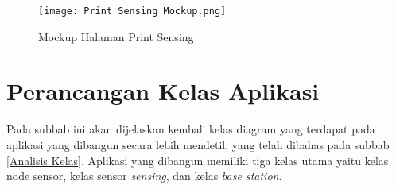     \begin{figure}[H]
    	\centering  
    	\texttt{[image: Print Sensing Mockup.png]}  
    	\caption[Mockup Halaman Print Sensing]{Mockup Halaman Print Sensing} 
    	\label{fig:Mockup Halaman Print Sensing} 
    \end{figure}
   
   

\section{Perancangan Kelas Aplikasi}
    
    Pada subbab ini akan dijelaskan kembali kelas diagram yang terdapat pada aplikasi yang dibangun secara lebih mendetil, yang telah dibahas pada subbab \ref{Analisis Kelas}. Aplikasi yang dibangun memiliki tiga kelas utama yaitu kelas node sensor, kelas sensor \textit{sensing}, dan kelas \textit{base station}.
    

    
    
        
